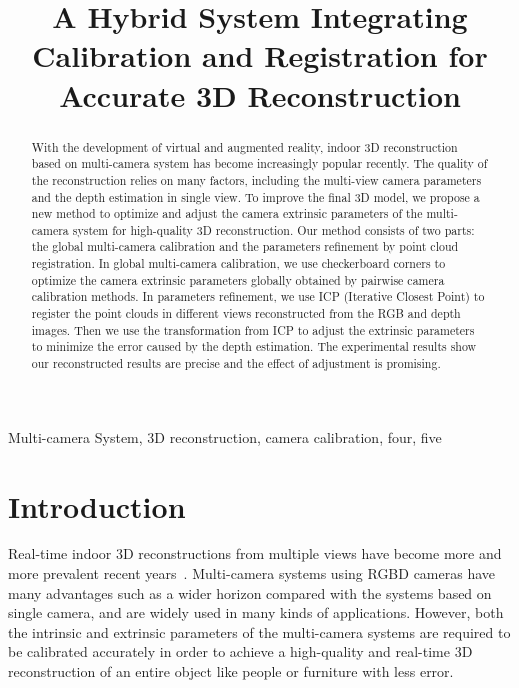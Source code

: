 \documentclass{article}
\begin{document}
\sloppy

\def\x{{\mathbf x}}
\def\L{{\cal L}}


\title{A Hybrid System Integrating Calibration and Registration for Accurate 3D Reconstruction}
%
\address{}


\maketitle


%
\begin{abstract}
With the development of virtual and augmented reality, indoor 3D reconstruction based on multi-camera system has become increasingly popular recently. The quality of the reconstruction relies on many factors, including the multi-view camera parameters and the depth estimation in single view. To improve the final 3D model, we propose a new method to optimize and adjust the camera extrinsic parameters of the multi-camera system for high-quality 3D reconstruction. Our method consists of two parts: the global multi-camera calibration and the parameters refinement by point cloud registration. In global multi-camera calibration, we use checkerboard corners to optimize the camera extrinsic parameters globally obtained by pairwise camera calibration methods. In parameters refinement, we use ICP (Iterative Closest Point) to register the point clouds in different views reconstructed from the RGB and depth images. Then we use the transformation from ICP to adjust the extrinsic parameters to minimize the error caused by the depth estimation. The experimental results show our reconstructed results are precise and the effect of adjustment is promising.
\end{abstract}
%
\begin{keywords}
Multi-camera System, 3D reconstruction, camera calibration, four, five
\end{keywords}
%
\section{Introduction}
\label{sec:intro}
Real-time indoor 3D reconstructions from multiple views have become more and more prevalent recent years~\cite{dou2016fusion4d,orts2016holoportation}. Multi-camera systems using RGBD cameras have many advantages such as a wider horizon compared with the systems based on single camera, and are widely used in many kinds of applications. However, both the intrinsic and extrinsic parameters of the multi-camera systems are required to be calibrated accurately in order to achieve a high-quality and real-time 3D reconstruction of an entire object like people or furniture with less error.
\end{document}
